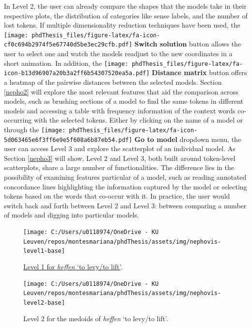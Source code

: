\documentclass[
]{book}
\begin{document}
In Level 2, the user can already compare the shapes that the models take in their respective plots, the distribution of categories like sense labels, and the number of lost tokens. If multiple dimensionality reduction techniques have been used, the
\texttt{[image: phdThesis\_files/figure-latex/fa-icon-cf0c694b2974f5e67740d5be3ec29cfb.pdf]} \textbf{Switch solution} button allows the user to select one and watch the models readjust to the new coordinates in a short animation. In addition, the
\texttt{[image: phdThesis\_files/figure-latex/fa-icon-b13d96907a20b3a2ff6b54307520ea5a.pdf]} \textbf{Distance matrix} button offers a heatmap of the pairwise distances between the selected models.
Section \ref{nepho2} will explore the most relevant features that aid the comparison across models, such as brushing sections of a model to find the same tokens in different models and accessing a table with frequency information of the context words co-occurring with the selected tokens. Either by clicking on the name of a model or through the
\texttt{[image: phdThesis\_files/figure-latex/fa-icon-5d063465e6f3ff6e9e5f608a6b87eb54.pdf]} \textbf{Go to model} dropdown menu, the user can access Level 3 and explore the scatterplot of an individual model. As Section \ref{nepho3} will show, Level 2 and Level 3, both built around token-level scatterplots, share a large number of functionalities. The difference lies in the possibility of examining features particular of a model, such as reading annotated concordance lines highlighting the information captured by the model or selecting tokens based on the words that co-occur with it. In practice, the user would switch back and forth between Level 2 and Level 3: between comparing a number of models and digging into particular models.



\begin{figure}
\texttt{[image: C:/Users/u0118974/OneDrive - KU Leuven/repos/montesmariana/phdThesis/assets/img/nephovis-level1-base]} \caption{\href{https://qlvl.github.io/NephoVis/level1.html?type=heffen}{Level 1 for \emph{heffen} `to levy/to lift'}.}\label{fig:nepho1-basic}
\end{figure}



\begin{figure}
\texttt{[image: C:/Users/u0118974/OneDrive - KU Leuven/repos/montesmariana/phdThesis/assets/img/nephovis-level2-base]} \caption{Level 2 for the medoids of \emph{heffen} `to levy/to lift'.}\label{fig:nepho2-basic}
\end{figure}
\end{document}
